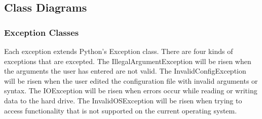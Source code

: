 \documentclass[parskip=full]{scrartcl}
\begin{document}
\subsection{Class Diagrams}

\subsubsection{Exception Classes}

Each exception extends Python's Exception class.
There are four kinds of exceptions that are excepted.
The IllegalArgumentException will be risen when the arguments the user has entered are not valid.
The InvalidConfigException will be risen when the user edited the configuration file with invalid arguments or syntax.
The IOException will be risen when errors occur while reading or writing data to the hard drive.
The InvalidOSException will be risen when trying to access functionality that is not supported on the current operating system.


\begin{figure}[h]
\begin{center}

\label{Exception Classes}
\end{center}
\end{figure}
\newpage
\end{document}
